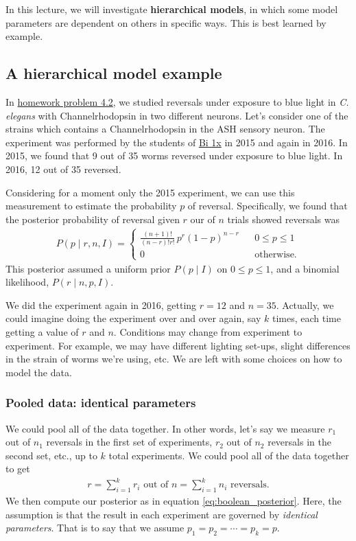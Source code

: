 In this lecture, we will investigate \textbf{hierarchical models}, in
which some model parameters are dependent on others in specific ways.
This is best learned by example.

\subsection{A hierarchical model example}
In
\href{http://bebi103.caltech.edu/2016/homework/hw4.html#Problem-4.2:-MCMC-with-Boolean-data-(40-pts)}{homework problem 4.2}, we studied reversals under exposure to blue light in
\textit{C. elegans} with Channelrhodopsin in two different neurons.
Let's consider one of the strains which contains a Channelrhodopsin in
the ASH sensory neuron. The experiment was performed by the students of \href{http://bi1x.caltech.edu/}{Bi 1x} in 2015 and again in 2016. In 2015, we found that 9 out of 35 worms reversed under exposure to blue light. In 2016, 12 out of 35 reversed.

Considering for a moment only the 2015 experiment, we can use this measurement to estimate the probability $p$ of reversal.  Specifically, we found that the
posterior probability of reversal given $r$ our of $n$ trials showed
reversals was
\begin{align}
P(p\mid r, n, I) = \left\{\begin{array}{ccl}
\displaystyle{\frac{(n+1)!}{(n-r)!r!}\,p^{r}(1-p)^{n-r}} && 0\le p \le 1 \\[1em]
0 & & \text{otherwise}.
\end{array}
\right.
\label{eq:boolean_posterior}
\end{align}
This posterior assumed a uniform prior $P(p\mid I)$ on $0\le p \le 1$,
and a binomial likelihood, $P(r\mid n, p , I)$.

We did the experiment again in 2016, getting $r = 12$ and $n = 35$. Actually, we could imagine
doing the experiment over and over again, say $k$ times, each time getting a value of
$r$ and $n$.  Conditions may change from experiment to experiment.
For example, we may have different lighting set-ups, slight
differences in the strain of worms we're using, etc.  We are left with
some choices on how to model the data.


\subsubsection{Pooled data: identical parameters}
We could pool all of the data together.  In other words, let's say we
measure $r_1$ out of $n_1$ reversals in the first set of experiments,
$r_2$ out of $n_2$ reversals in the second set, etc., up to $k$ total
experiments.  We could pool all of the data together to get
\begin{align}
r = \sum_{i=1}^k r_i \text{ out of } n = \sum_{i=1}^k n_i \text{ reversals}.
\end{align}
We then compute our posterior as in equation
\eqref{eq:boolean_posterior}.  Here, the assumption is that the result
in each experiment are governed by \textit{identical parameters}.
That is to say that we assume $p_1 = p_2 = \cdots = p_k = p$.

